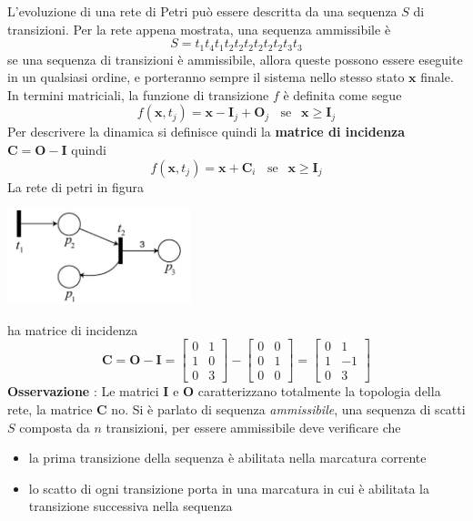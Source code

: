 \documentclass[10pt, letterpaper]{report}
\begin{document}
L'evoluzione di una rete di Petri può essere descritta da una sequenza $S$ di transizioni. Per la rete appena mostrata, una sequenza ammissibile è 
$$ S=t_1t_4t_1t_2t_2t_2t_2t_2t_2t_3t_3$$
\prop{} se una sequenza di transizioni è ammissibile, allora queste possono essere eseguite in un qualsiasi ordine, e porteranno sempre il sistema nello stesso stato $\mathbf x$ finale.\acc 
In termini matriciali, la funzione di transizione $f$ è definita come segue 
$$ f(\mathbf x,t_j)=\mathbf x -\mathbf I_j + \mathbf O_j \ \ \ \ \text{se }  \ \ \mathbf x\ge \mathbf I_j$$
Per descrivere la dinamica si definisce quindi la \textbf{matrice di incidenza} $\mathbf C = \mathbf O - \mathbf I$ 
quindi 
$$ f(\mathbf x,t_j)=\mathbf x +\mathbf C_i\ \ \ \ \text{se } \ \ \mathbf x\ge \mathbf I_j$$
La rete di petri in figura \begin{center}
    \includegraphics[width=0.4\textwidth]{images/petri4.png}
\end{center}
ha matrice di incidenza $$ \mathbf C = \mathbf O - \mathbf I = \begin{bmatrix}
    0 & 1 \\ 1 & 0 \\ 0 & 3
\end{bmatrix}-\begin{bmatrix}
    0 & 0 \\ 0 & 1 \\ 0 & 0 
\end{bmatrix}=\begin{bmatrix}
    0 & 1 \\ 1 & -1 \\ 0 & 3
\end{bmatrix}$$
\textbf{Osservazione} : Le matrici $\mathbf I$ e $\mathbf O$ caratterizzano totalmente la topologia della rete, la matrice $\mathbf C$ no.\acc 
Si è parlato di sequenza \textit{ammissibile}, una sequenza di scatti $S$ composta da $n$ transizioni, per essere ammissibile deve verificare che \begin{itemize}
    \item la prima transizione della sequenza è abilitata nella marcatura corrente
    \item lo scatto di ogni transizione porta in una marcatura in cui è abilitata la transizione
    successiva nella sequenza
\end{itemize}
\end{document}
